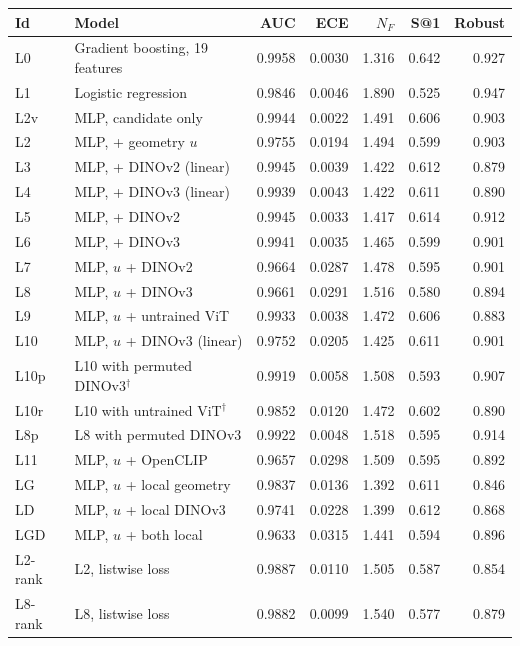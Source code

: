 \begin{tabular}{llrrrrr}
\toprule
Id & Model & AUC & ECE & $N_F$ & S@1 & Robust \\
\midrule
L0 & Gradient boosting, 19 features & 0.9958 & 0.0030 & 1.316 & 0.642 & 0.927 \\
L1 & Logistic regression & 0.9846 & 0.0046 & 1.890 & 0.525 & 0.947 \\
L2v & MLP, candidate only & 0.9944 & 0.0022 & 1.491 & 0.606 & 0.903 \\
L2 & MLP, + geometry $u$ & 0.9755 & 0.0194 & 1.494 & 0.599 & 0.903 \\
L3 & MLP, + DINOv2 (linear) & 0.9945 & 0.0039 & 1.422 & 0.612 & 0.879 \\
L4 & MLP, + DINOv3 (linear) & 0.9939 & 0.0043 & 1.422 & 0.611 & 0.890 \\
L5 & MLP, + DINOv2 & 0.9945 & 0.0033 & 1.417 & 0.614 & 0.912 \\
L6 & MLP, + DINOv3 & 0.9941 & 0.0035 & 1.465 & 0.599 & 0.901 \\
L7 & MLP, $u$ + DINOv2 & 0.9664 & 0.0287 & 1.478 & 0.595 & 0.901 \\
L8 & MLP, $u$ + DINOv3 & 0.9661 & 0.0291 & 1.516 & 0.580 & 0.894 \\
L9 & MLP, $u$ + untrained ViT & 0.9933 & 0.0038 & 1.472 & 0.606 & 0.883 \\
L10 & MLP, $u$ + DINOv3 (linear) & 0.9752 & 0.0205 & 1.425 & 0.611 & 0.901 \\
L10p & L10 with permuted DINOv3$^\dagger$ & 0.9919 & 0.0058 & 1.508 & 0.593 & 0.907 \\
L10r & L10 with untrained ViT$^\dagger$ & 0.9852 & 0.0120 & 1.472 & 0.602 & 0.890 \\
L8p & L8 with permuted DINOv3 & 0.9922 & 0.0048 & 1.518 & 0.595 & 0.914 \\
L11 & MLP, $u$ + OpenCLIP & 0.9657 & 0.0298 & 1.509 & 0.595 & 0.892 \\
LG & MLP, $u$ + local geometry & 0.9837 & 0.0136 & 1.392 & 0.611 & 0.846 \\
LD & MLP, $u$ + local DINOv3 & 0.9741 & 0.0228 & 1.399 & 0.612 & 0.868 \\
LGD & MLP, $u$ + both local & 0.9633 & 0.0315 & 1.441 & 0.594 & 0.896 \\
L2-rank & L2, listwise loss & 0.9887 & 0.0110 & 1.505 & 0.587 & 0.854 \\
L8-rank & L8, listwise loss & 0.9882 & 0.0099 & 1.540 & 0.577 & 0.879 \\
\bottomrule
\end{tabular}
